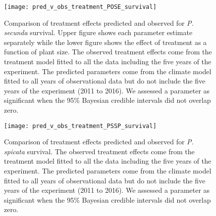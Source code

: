 \documentclass[11pt]{article}
\begin{document}
\begin{figure}[!htbp]
	\centering
	\texttt{[image: pred\_v\_obs\_treatment\_POSE\_survival]}
	\caption{Comparison of treatment effects predicted and observed for \textit{P. secunda} survival.  Upper figure shows each parameter estimate separately while the lower figure shows the effect of treatment as a function of plant size.  The observed treatment effects come from the treatment model fitted to all the data including the five years of the experiment.  The predicted parameters come from the climate model fitted to all years of observational data but do not include the five years of the experiment (2011 to 2016). We assessed a parameter as significant when the 95\% Bayesian credible intervals did not overlap zero.}
	\label{fig:parPredPOSESurvival}
\end{figure}

\begin{figure}[!htbp]
	\centering
	\texttt{[image: pred\_v\_obs\_treatment\_PSSP\_survival]}
	\caption{Comparison of treatment effects predicted and observed for \textit{P. spicata} survival.  The observed treatment effects come from the treatment model fitted to all the data including the five years of the experiment.  The predicted parameters come from the climate model fitted to all years of observational data but do not include the five years of the experiment (2011 to 2016). We assessed a parameter as significant when the 95\% Bayesian credible intervals did not overlap zero.}
	\label{fig:parPredPSSPSurvival}
\end{figure}
\end{document}
